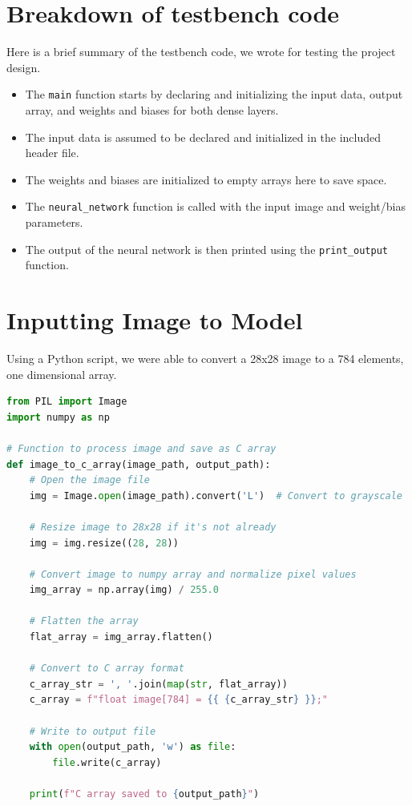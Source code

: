\documentclass{report}
\begin{document}
\section{Breakdown of testbench code}
Here is a brief summary of the testbench code, we wrote for testing the project design.

\begin{itemize}
    \item The \texttt{main} function starts by declaring and initializing the input data, output array, and weights and biases for both dense layers.
    \item The input data is assumed to be declared and initialized in the included header file.
    \item The weights and biases are initialized to empty arrays here to save space.
    \item The \texttt{neural\_network} function is called with the input image and weight/bias parameters.
    \item The output of the neural network is then printed using the \texttt{print\_output} function.
\end{itemize}


\section{Inputting Image to Model}
Using a Python script, we were able to convert a 28x28 image to a 784 elements, one dimensional array. 

\begin{lstlisting}[language=Python]
from PIL import Image
import numpy as np

# Function to process image and save as C array
def image_to_c_array(image_path, output_path):
    # Open the image file
    img = Image.open(image_path).convert('L')  # Convert to grayscale

    # Resize image to 28x28 if it's not already
    img = img.resize((28, 28))

    # Convert image to numpy array and normalize pixel values
    img_array = np.array(img) / 255.0

    # Flatten the array
    flat_array = img_array.flatten()

    # Convert to C array format
    c_array_str = ', '.join(map(str, flat_array))
    c_array = f"float image[784] = {{ {c_array_str} }};"

    # Write to output file
    with open(output_path, 'w') as file:
        file.write(c_array)

    print(f"C array saved to {output_path}")

\end{lstlisting}
\end{document}

